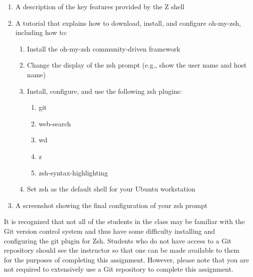 \begin{enumerate}
	
	\item A description of the key features provided by the Z shell

	\item A tutorial that explains how to download, install, and configure oh-my-zsh, including how to:

	  \begin{enumerate}

	    \item Install the oh-my-zsh community-driven framework

	    \item Change the display of the zsh prompt (e.g., show the user name and host name)

	    \item Install, configure, and use the following zsh plugins:

	      \begin{enumerate}

	        \item git
		  
		\item web-search

		\item wd 	

		\item z

		\item zsh-syntax-highlighting

	      \end{enumerate}

	    \item Set zsh as the default shell for your Ubuntu workstation

	  \end{enumerate}

	\item A screenshot showing the final configuration of your zsh prompt

\end{enumerate}

It is recognized that not all of the students in the class may be familiar with the Git version control system and thus have some
difficulty installing and configuring the git plugin for Zsh.  Students who do not have access to a Git repository should see the
instructor so that one can be made available to them for the purposes of completing this assignment. However, please note that you
are not required to extensively use a Git repository to complete this assignment.

